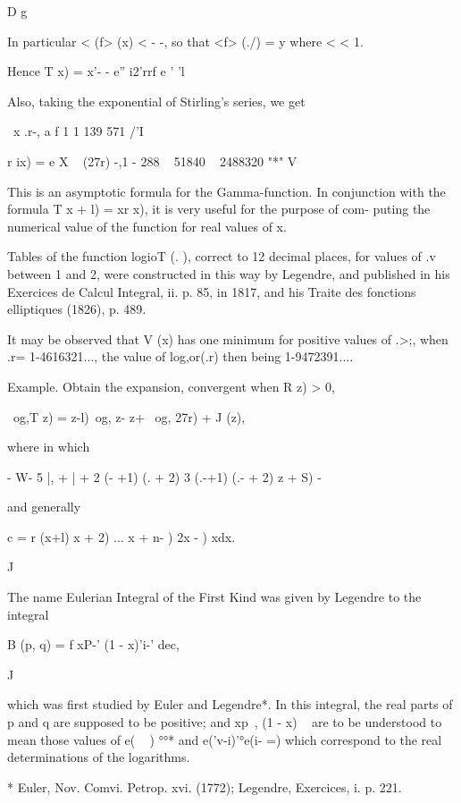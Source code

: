 D g

In particular < (f> (x) < - -, so that <f> (./) = y where < < 1.

Hence T x) = x'- - e'' i2'rrf e ' 'l

Also, taking the exponential of Stirling's series, we get

\ x .r-, a f 1 1 139 571 /'I

r ix) = e X ~ (27r) -,1 - 288 ~ 51840 ~ 2488320 "*" V

This is an asymptotic formula for the Gamma-function. In conjunction
with the formula T x + l) = xr x), it is very useful for the purpose
of com- puting the numerical value of the function for real values of
x.

Tables of the function logioT (. ), correct to 12 decimal places, for
values of .v between 1 and 2, were constructed in this way by
Legendre, and published in his Exercices de Calcul Integral, ii. p.
85, in 1817, and his Traite des fonctions elliptiques (1826), p. 489.

It may be observed that V (x) has one minimum for positive values of
.>;, when .r= 1-4616321..., the value of log,or(.r) then being
1-9472391....

Example. Obtain the expansion, convergent when R z) > 0,

\ og,T z) = z-l)\ og, z- z+ \ og, 27r) + J (z),

where in which

- W- 5 |, + | + 2 (- +1) (. + 2) 3 (.-+1) (.- + 2) z + S) -

and generally

c = r (x+l) x + 2) ... x + n- ) 2x - ) xdx. 

J


The name Eulerian Integral of the First Kind was given by Legendre to
the integral

B (p, q) = f xP-' (1 - x)'i-' dec,

J

which was first studied by Euler and Legendre*. In this integral, the
real parts of p and q are supposed to be positive; and xp~, (1 - x) ~
are to be understood to mean those values of e( ~ ) °°* and
e('v-i)'°e(i- =) which correspond to the real determinations of the
logarithms.

* Euler, Nov. Comvi. Petrop. xvi. (1772); Legendre, Exercices, i. p.
221.

%
%

